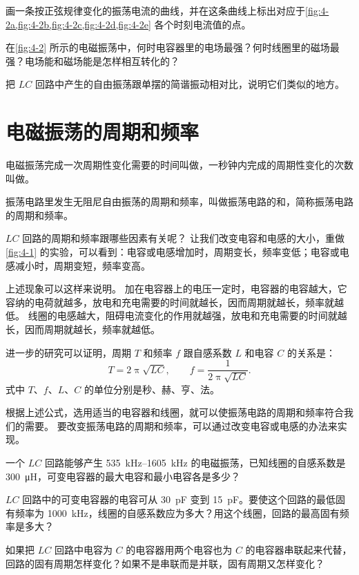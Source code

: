 \begin{Practice}
\begin{question}
	\item 画一条按正弦规律变化的振荡电流的曲线，并在这条曲线上标出对应于\cref{fig:4-2a,fig:4-2b,fig:4-2c,fig:4-2d,fig:4-2e} 各个时刻电流值的点。
	\item 在\cref{fig:4-2} 所示的电磁振荡中，何时电容器里的电场最强？何时线圈里的磁场最强？电场能和磁场能是怎样相互转化的？
	\item 把 $LC$ 回路中产生的自由振荡跟单摆的简谐振动相对比，说明它们类似的地方。
\end{question}
\end{Practice}


\section{电磁振荡的周期和频率}
电磁振荡完成一次周期性变化需要的时间叫做，一秒钟内完成的周期性变化的次数叫做。

振荡电路里发生无阻尼自由振荡的周期和频率，叫做振荡电路的和，简称振荡电路的周期和频率。

$LC$ 回路的周期和频率跟哪些因素有关呢？
让我们改变电容和电感的大小，重做\cref{fig:4-1} 的实验，可以看到：电容或电感增加时，周期变长，频率变低；电容或电感减小时，周期变短，频率变高。

上述现象可以这样来说明。
加在电容器上的电压一定时，电容器的电容越大，它容纳的电荷就越多，放电和充电需要的时间就越长，因而周期就越长，频率就越低。
线圈的电感越大，阻碍电流变化的作用就越强，放电和充电需要的时间就越长，因而周期就越长，频率就越低。

进一步的研究可以证明，周期 $T$ 和频率 $f$ 跟自感系数 $L$ 和电容 $C$ 的关系是：
\[T=2\uppi\sqrt{LC},\qquad f=\frac{1}{2\uppi\sqrt{LC}}.\]
式中 $T$、$f$、$L$、$C$ 的单位分别是秒、赫、亨、法。

根据上述公式，选用适当的电容器和线圈，就可以使振荡电路的周期和频率符合我们的需要。
要改变振荡电路的周期和频率，可以通过改变电容或电感的办法来实现。

\begin{Practice}
\begin{question}
	\item 一个 $LC$ 回路能够产生 \qtyrange{535}{1605}{kHz} 的电磁振荡，已知线圈的自感系数是 \qty{300}{\micro H}，可变电容器的最大电容和最小电容各是多少？
	\item $LC$ 回路中的可变电容器的电容可从 \qty{30}{\pico F} 变到 \qty{15}{\pico F}。要使这个回路的最低固有频率为 \qty{1000}{kHz}，线圈的自感系数应为多大？用这个线圈，回路的最高固有频率是多大？
	\item 如果把 $LC$ 回路中电容为 $C$ 的电容器用两个电容也为 $C$ 的电容器串联起来代替，回路的固有周期怎样变化？如果不是串联而是并联，固有周期又怎样变化？
\end{question}
\end{Practice}


